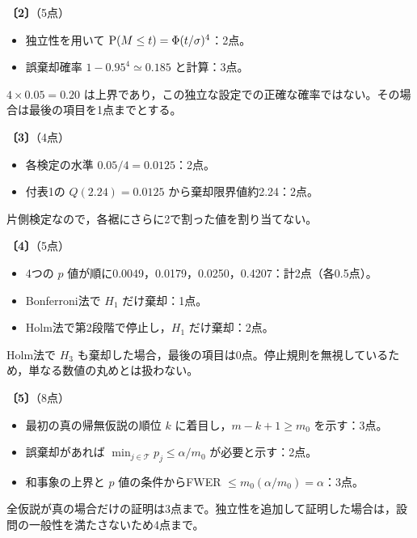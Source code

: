 \documentclass[a4paper,11pt]{ltjsarticle}
\renewcommand{\ans}[1]{\par\medskip\noindent\textbf{〔#1〕}\quad}
\renewcommand{\points}[1]{\hfill\textnormal{（#1点）}\par\nobreak}
\begin{document}
\ans{2}\points{5}
\begin{itemize}
\item 独立性を用いて $\operatorname{P}(M\leq t)=\Phi(t/\sigma)^4$：2点。
\item 誤棄却確率 $1-0.95^4\simeq0.185$ と計算：3点。
\end{itemize}
$4\times0.05=0.20$ は上界であり，この独立な設定での正確な確率ではない。その場合は最後の項目を1点までとする。

\ans{3}\points{4}
\begin{itemize}
\item 各検定の水準 $0.05/4=0.0125$：2点。
\item 付表1の $Q(2.24)=0.0125$ から棄却限界値約2.24：2点。
\end{itemize}
片側検定なので，各裾にさらに2で割った値を割り当てない。

\ans{4}\points{5}
\begin{itemize}
\item 4つの $p$ 値が順に0.0049，0.0179，0.0250，0.4207：計2点（各0.5点）。
\item Bonferroni法で $H_1$ だけ棄却：1点。
\item Holm法で第2段階で停止し，$H_1$ だけ棄却：2点。
\end{itemize}
Holm法で $H_3$ も棄却した場合，最後の項目は0点。停止規則を無視しているため，単なる数値の丸めとは扱わない。

\ans{5}\points{8}
\begin{itemize}
\item 最初の真の帰無仮説の順位 $k$ に着目し，$m-k+1\geq m_0$ を示す：3点。
\item 誤棄却があれば $\min_{j\in\mathcal T}p_j\leq\alpha/m_0$ が必要と示す：2点。
\item 和事象の上界と $p$ 値の条件からFWER $\leq m_0(\alpha/m_0)=\alpha$：3点。
\end{itemize}
全仮説が真の場合だけの証明は3点まで。独立性を追加して証明した場合は，設問の一般性を満たさないため4点まで。
\end{document}
